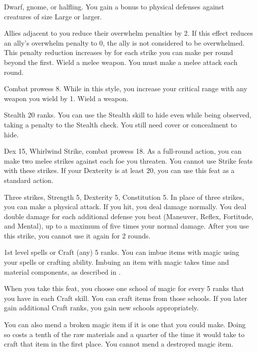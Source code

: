 \featpres Dwarf, gnome, or halfling.
\featben You gain a  bonus to physical defenses against creatures of size Large or larger.

\featben Allies adjacent to you reduce their overwhelm penalties by 2.
If this effect reduces an ally's overwhelm penalty to 0, the ally is not considered to be overwhelmed.
This penalty reduction increases by  for each strike you can make per round beyond the first.
\stylereq Wield a melee weapon.
You must make a melee attack each round.

\featpre Combat prowess 8.
\featben While in this style, you increase your critical range with any weapon you wield by 1.
\stylereq Wield a weapon.

\featpre Stealth 20 ranks.
\featben You can use the Stealth skill to hide even while being observed, taking a  penalty to the Stealth check.
You still need cover or concealment to hide.

\featpres Dex 15, Whirlwind Strike, combat prowess 18.
\featben As a full-round action, you can make two melee strikes against each foe you threaten. You cannot use Strike feats with these strikes.
If your Dexterity is at least 20, you can use this feat as a standard action.

\featpre Three strikes, Strength 5, Dexterity 5, Constitution 5.
\featben In place of three strikes, you can make a physical attack.
If you hit, you deal damage normally.
You deal double damage for each additional defense you beat (Maneuver, Reflex, Fortitude, and Mental), up to a maximum of five times your normal damage.
After you use this strike, you cannot use it again for 2 rounds.

\featpre 1st level spells or Craft (any) 5 ranks.
\featben You can imbue items with magic using your spells or crafting ability.
Imbuing an item with magic takes time and material components, as described in .

When you take this feat, you choose one school of magic for every 5 ranks that you have in each Craft skill.
You can craft items from those schools.
If you later gain additional Craft ranks, you gain new schools appropriately.

You can also mend a broken magic item if it is one that you could make.
Doing so costs a tenth of the raw materials and a quarter of the time it would take to craft that item in the first place.
You cannot mend a destroyed magic item.

